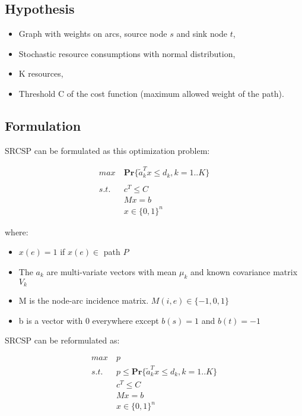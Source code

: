 \documentclass{beamer}
\begin{document}
\subsection{Hypothesis}
\begin{frame}
	\begin{itemize}
		\item Graph with weights on arcs, source node $s$ and sink node $t$,
		\item Stochastic resource consumptions with normal distribution,
		\item K resources,
		\item Threshold C of the cost function (maximum allowed weight of the path).
	\end{itemize}
\end{frame}

\subsection{Formulation}
\begin{frame}

SRCSP can be formulated as this optimization problem:

\begin{align*}
 max\ &\mathbf{Pr} \{ \tilde{a}_k^Tx \leq d_k, k=1..K \} \\ \\
 s.t.\ &c^T \leq C \\
 &Mx = b \\
 &x \in \{0, 1\}^n
\end{align*}

where:

\begin{itemize}
	\item $x(e) = 1$ if $x(e) \in $ path $P$
	\item The $a_k$ are multi-variate vectors with mean $\mu_k$ and known covariance matrix $V_k$
	\item M is the node-arc incidence matrix. $M(i, e) \in \{-1, 0, 1\}$
	\item b is a vector with 0 everywhere except $b(s) = 1$ and $b(t) = -1$
\end{itemize}

\end{frame}

\begin{frame}

SRCSP can be reformulated as:

\begin{align*}
 max\ & p\\
 s.t.\ & p \leq \mathbf{Pr} \{ \tilde{a}_k^Tx \leq d_k, k=1..K \} \\
 & c^T \leq C \\
 & Mx = b \\
 & x \in \{0, 1\}^n
\end{align*}

\end{frame}
\end{document}
